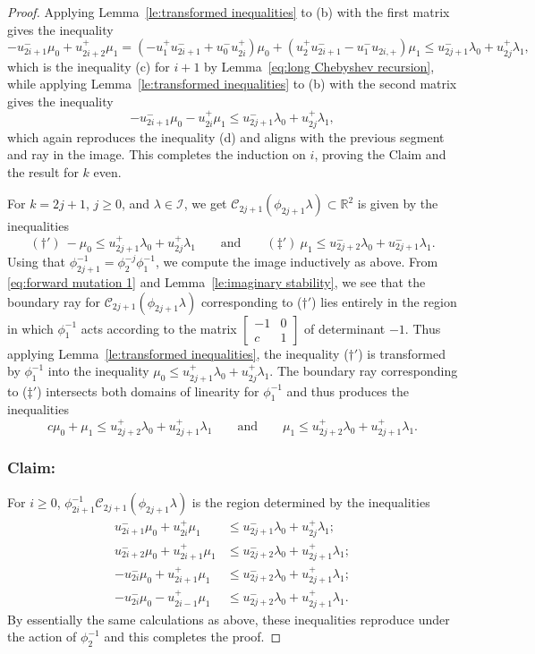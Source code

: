 \documentclass{amsart}
\numberwithin{theorem}{section}
\newcommand{\cC}{\mathcal{C}}
\newcommand{\cI}{\mathcal{I}}
\newcommand{\RR}{\mathbb{R}}
\begin{document}
\begin{proof}
    Applying Lemma~\ref{le:transformed inequalities} to (b) with the first matrix gives the inequality 
    \[-u_{2i+1}^-\mu_0+u_{2i+2}^+\mu_1=(-u_1^+u_{2i+1}^-+u_0^-u_{2i}^+)\mu_0+(u_2^+u_{2i+1}^--u_1^-u_{2i,+})\mu_1\le u_{2j+1}^-\lambda_0+u_{2j}^+\lambda_1,\]
    which is the inequality (c) for $i+1$ by Lemma~\ref{eq:long Chebyshev recursion}, while applying Lemma~\ref{le:transformed inequalities} to (b) with the second matrix gives the inequality 
    \[-u_{2i+1}^-\mu_0-u_{2i}^+\mu_1\le u_{2j+1}^-\lambda_0+u_{2j}^+\lambda_1,\]
    which again reproduces the inequality (d) and aligns with the previous segment and ray in the image.
    This completes the induction on $i$, proving the Claim and the result for $k$ even.

    For $k=2j+1$, $j\ge0$, and $\lambda\in\cI$, we get $\cC_{2j+1}(\phi_{2j+1}\lambda)\subset\RR^2$ is given by the inequalities 
    \[ (\dagger')\ -\mu_0\le u_{2j+1}^+\lambda_0+u_{2j}^+\lambda_1 \qquad\text{and}\qquad (\ddagger')\ \mu_1\le u_{2j+2}^-\lambda_0+u_{2j+1}^-\lambda_1.\]
    Using that $\phi_{2j+1}^{-1}=\phi_2^{-j}\phi_1^{-1}$, we compute the image inductively as above.
    From \eqref{eq:forward mutation 1} and Lemma~\ref{le:imaginary stability}, we see that the boundary ray for $\cC_{2j+1}(\phi_{2j+1}\lambda)$ corresponding to ($\dagger'$) lies entirely in the region in which $\phi_1^{-1}$ acts according to the matrix $\left[ \begin{array}{cc} -1 & 0\\ c & 1 \end{array}\right]$ of determinant $-1$.
    Thus applying Lemma~\ref{le:transformed inequalities}, the inequality ($\dagger'$) is transformed by $\phi_1^{-1}$ into the inequality $\mu_0\le u_{2j+1}^+\lambda_0+u_{2j}^+\lambda_1$.
    The boundary ray corresponding to ($\ddagger'$) intersects both domains of linearity for $\phi_1^{-1}$ and thus produces the inequalities
    \[ c\mu_0+\mu_1\le u_{2j+2}^+\lambda_0+u_{2j+1}^+\lambda_1 \qquad\text{and}\qquad \mu_1\le u_{2j+2}^+\lambda_0+u_{2j+1}^+\lambda_1.\]

    \subsubsection*{Claim:} For $i\ge 0$, $\phi_{2i+1}^{-1}\cC_{2j+1}(\phi_{2j+1}\lambda)$ is the region determined by the inequalities 
    \begin{align*}
      \tag{a$'$} u_{2i+1}^-\mu_0+u_{2i}^+\mu_1 &\le u_{2j+1}^-\lambda_0+u_{2j}^+\lambda_1;\\
      \tag{b$'$} u_{2i+2}^-\mu_0+u_{2i+1}^+\mu_1 &\le u_{2j+2}^-\lambda_0+u_{2j+1}^+\lambda_1;\\
      \tag{c$'$} -u_{2i}^-\mu_0+u_{2i+1}^+\mu_1 &\le u_{2j+2}^-\lambda_0+u_{2j+1}^+\lambda_1;\\
      \tag{d$'$} -u_{2i}^-\mu_0-u_{2i-1}^+\mu_1 &\le u_{2j+2}^-\lambda_0+u_{2j+1}^+\lambda_1.
    \end{align*}
    By essentially the same calculations as above, these inequalities reproduce under the action of $\phi_2^{-1}$ and this completes the proof.
  \end{proof}
\end{document}
